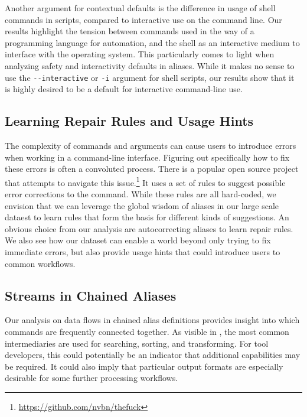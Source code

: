 Another argument for contextual defaults is the difference in usage of shell commands in scripts, compared to interactive use on the command line.
Our results highlight the tension between commands used in the way of a programming language for automation, and the shell as an interactive medium to interface with the operating system.
This particularly comes to light when analyzing safety and interactivity defaults in aliases.
While it makes no sense to use the \verb|--interactive| or \verb|-i| argument for shell scripts, our results show that it is highly desired to be a default for interactive command-line use.

\subsection{Learning Repair Rules and Usage Hints}

The complexity of commands and arguments can cause users to introduce errors when working in a command-line interface.
Figuring out specifically how to fix these errors is often a convoluted process.
There is a popular open source project that attempts to navigate this issue.\footnote{\url{https://github.com/nvbn/thefuck}}
It uses a set of rules to suggest possible error corrections to the command.
While these rules are all hard-coded, we envision that we can leverage the global wisdom of aliases in our large scale dataest to learn rules that form the basis for different kinds of suggestions.
An obvious choice from our analysis are autocorrecting aliases to learn repair rules.
We also see how our dataset can enable a world beyond only trying to fix immediate errors, but also provide usage hints that could introduce users to common workflows.

\subsection{Streams in Chained Aliases}

Our analysis on data flows in chained alias definitions provides insight into which commands are frequently connected together.
As visible in , the most common intermediaries are used for searching, sorting, and transforming.
For tool developers, this could potentially be an indicator that additional capabilities may be required.
It could also imply that particular output formats are especially desirable for some further processing workflows.



